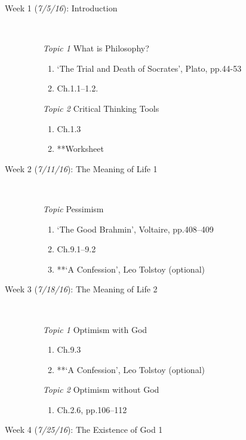 \documentclass[article,oneside]{memoir}
\begin{document}
\begin{description}

\item[Week 1 (\textit{7/5/16}):  Introduction]\
\begin{enumerate}
\item[\textit{Topic 1}] What is Philosophy?
\begin{enumerate}
\item `The Trial and Death of Socrates', Plato, pp.44-53
\item Ch.1.1--1.2.
\end{enumerate}
\item[\textit{Topic 2}] Critical Thinking Tools 
\begin{enumerate}
\item Ch.1.3
\item **Worksheet
\end{enumerate}
\end{enumerate}

\item[Week 2 (\textit{7/11/16}): The Meaning of Life 1]\
\begin{enumerate}
\item[\textit{Topic}] Pessimism 
\begin{enumerate}
\item `The Good Brahmin', Voltaire, pp.408--409
\item Ch.9.1--9.2 
\item **`A Confession', Leo Tolstoy (optional)
\end{enumerate}
\end{enumerate}

\item[Week 3 (\textit{7/18/16}): The Meaning of Life 2]\
\begin{enumerate}
\item[\textit{Topic 1}] Optimism with God
\begin{enumerate}
\item Ch.9.3
\item **`A Confession', Leo Tolstoy (optional)
\end{enumerate}
\item[\textit{Topic 2}] Optimism without God
\begin{enumerate}
\item Ch.2.6, pp.106--112
\end{enumerate}
\end{enumerate}


\item[Week 4 (\textit{7/25/16}):  The Existence of God 1]\


\end{description}
\end{document}
